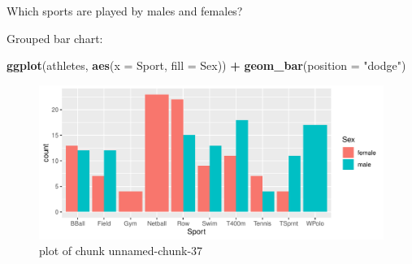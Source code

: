 \documentclass[ignorenonframetext,]{beamer}
\newenvironment{Shaded}{\begin{snugshade}}{\end{snugshade}}
\newcommand{\DataTypeTok}[1]{\textcolor[rgb]{0.13,0.29,0.53}{#1}}
\newcommand{\KeywordTok}[1]{\textcolor[rgb]{0.13,0.29,0.53}{\textbf{#1}}}
\newcommand{\NormalTok}[1]{#1}
\newcommand{\OperatorTok}[1]{\textcolor[rgb]{0.81,0.36,0.00}{\textbf{#1}}}
\newcommand{\StringTok}[1]{\textcolor[rgb]{0.31,0.60,0.02}{#1}}
\begin{document}
\begin{frame}[fragile]{Which sports are played by males and females?}
\protect\hypertarget{which-sports-are-played-by-males-and-females}{}

Grouped bar chart:

\begin{Shaded}
\begin{Highlighting}[]
\KeywordTok{ggplot}\NormalTok{(athletes, }\KeywordTok{aes}\NormalTok{(}\DataTypeTok{x =}\NormalTok{ Sport, }\DataTypeTok{fill =}\NormalTok{ Sex)) }\OperatorTok{+}
\StringTok{  }\KeywordTok{geom_bar}\NormalTok{(}\DataTypeTok{position =} \StringTok{"dodge"}\NormalTok{)}
\end{Highlighting}
\end{Shaded}

\begin{figure}
\centering
\includegraphics{figure/unnamed-chunk-37-1.pdf}
\caption{plot of chunk unnamed-chunk-37}
\end{figure}

\end{frame}
\end{document}
